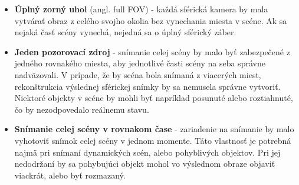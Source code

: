 \documentclass[slovak,master,dept460,male,cpp,cpdeclaration]{diploma}
\begin{document}
\begin{itemize}
\item \textbf{Úplný zorný uhol} (angl. full FOV) - každá sférická kamera by mala vytvárať obraz z celého svojho okolia bez vynechania miesta v scéne. Ak sa nejaká časť scény vynechá, nejedná sa o úplný sférický záber.
\item \textbf{Jeden pozorovací zdroj} - snímanie celej scény by malo  byť zabezpečené z jedného rovnakého miesta, aby jednotlivé časti scény na seba správne nadväzovali. V prípade, že by scéna bola snímaná z viacerých miest, rekonštrukcia výslednej sférickej snímky  by sa nemusela správne vytvoriť. Niektoré objekty v scéne by mohli byť napríklad posunuté alebo roztiahnuté, čo by nezodpovedalo reálnemu stavu.
\item \textbf{Snímanie celej scény v rovnakom čase} - zariadenie na snímanie by malo vyhotoviť snímok celej scény v jednom momente. Táto vlastnosť je potrebná najmä pri snímaní dynamických scén, alebo pohyblivých objektov. Pri jej nedodržaní by sa pohybujúci objekt mohol vo výslednom obraze objaviť viackrát, alebo byť rozmazaný.
\end{itemize}
\end{document}
